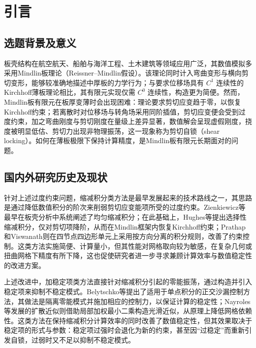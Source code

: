 \documentclass[internationalmaster]{hquThesis}
\begin{document}
\makecover
% 
% 

\frontmatter{
    
    \tableofcontents
}

\mainmatter


\chapter{引言}

\section{选题背景及意义}

板壳结构在航空航天、船舶与海洋工程、土木建筑等领域应用广泛，其数值模拟多采用Mindlin板理论（Reissner--Mindlin假设）\cite{reissner1947}。该理论同时计入弯曲变形与横向剪切变形，能够较准确地描述中厚板的力学行为；与要求位移场具有 $C^{1}$ 连续性的Kirchhoff薄板理论\cite{key1968}相比，其有限元实现仅需 $C^{0}$ 连续性，构造更为简便。然而，Mindlin板有限元在板厚变薄时会出现困难：理论要求剪切应变趋于零，以恢复Kirchhoff约束；若离散时对位移场与转角场采用同阶插值，剪切应变便会受到过度约束\cite{LXXB202201009,LXXB201704018,kim2023}，加之弯曲刚度与剪切刚度在量级上差异显著\cite{hughes1978}，数值解会呈现虚假刚度，挠度被明显低估、剪切力出现非物理振荡，这一现象称为剪切自锁（shear locking）\cite{LXXB202001010,JSJG200904011,prathap1983,LXXB202201009}。如何在薄板极限下保持计算精度，是Mindlin板有限元长期面对的问题。

\section{国内外研究历史及现状}

针对上述过度约束问题，缩减积分类方法是最早发展起来的技术路线之一，其思路是通过降低数值积分的阶次来削弱剪切应变能项所受的过度约束。Zienkiewicz等最早在板壳分析中系统阐述了均匀缩减积分\cite{zienkiewicz1971}；在此基础上，Hughes等提出选择性缩减积分，仅对剪切项降阶，从而在Mindlin框架内恢复Kirchhoff约束\cite{hughes1978}；Prathap和Viswanath则在四节点四边形单元上采用按方向分离的积分规则，改善了约束控制\cite{prathap1983}。这类方法实施简便、计算量小，但其性能对网格取向较为敏感，在复杂几何或扭曲网格下精度有所下降\cite{prathap1983}，这也促使研究者进一步寻求兼顾计算效率与数值稳定性的改进方案。

上述改进中，加稳定项类方法直接针对缩减积分引起的零能振荡，通过构造并引入稳定项来抑制不稳定模式。Belytschko等提出了适用于单点积分的正交沙漏控制方法，其做法是隔离零能模式并施加相应的控制力，以保证计算的稳定性\cite{flanagan1981}；Nayroles等发展的扩散近似则借助局部加权最小二乘构造光滑近似，从原理上降低网格依赖性\cite{nayroles1992}。这类方法在保持缩减积分计算效率的同时改善了数值稳定性\cite{wu2023}，但其效果取决于稳定项的形式与参数\cite{kaiser2024,marzok2025}：稳定项过强时会退化为新的约束，甚至因``过稳定''而重新引发自锁，过弱时又不足以抑制不稳定模式\cite{flanagan1981}。
\end{document}
